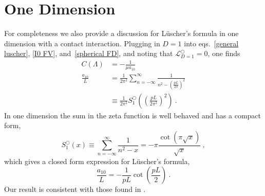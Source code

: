 \section{One Dimension}\label{sec:1D}
For completeness we also provide a discussion for L\"uscher's formula in one dimension with a contact interaction.  Plugging in $D=1$ into eqs.~\eqref{general luscher}, \eqref{I0 FV}, and~\eqref{spherical FD}, and noting that $\mathcal{L}_{D=1}^\bigcirc=0$, one finds
\begin{align} 
C(\Lambda)&=-\frac{1}{\mu a_{10}}\\
\frac{a_{10}}{L} &=\frac{1}{2 \pi^{2}} \sum_{n=-\infty}^{\infty} \frac{1}{n^{2}-\left(\frac{p L}{2 \pi}\right)^{2}} \\ 
& \equiv \frac{1}{2 \pi^{2}} S^\bigcirc_{1}\left(\left(\frac{p L}{2 \pi^{2}}\right)^{2}\right)\ .
\end{align}
In one dimension the sum in the zeta function is well behaved and has a compact form,
\begin{equation}
S^\bigcirc_{1}(x) \equiv \sum_{n=-\infty}^{\infty} \frac{1}{n^{2}-x}=-\pi \frac{\cot (\pi \sqrt{x})}{\sqrt{x}}\ ,
\end{equation}
which gives a closed form expression for L\"uscher's formula,
\begin{equation}\label{eq:1d luscher}
\frac{a_{10}}{L} =-\frac{1}{pL}\cot\left(\frac{pL}{2}\right)\ . 
\end{equation}
Our result is consistent with those found in \cite{}.

